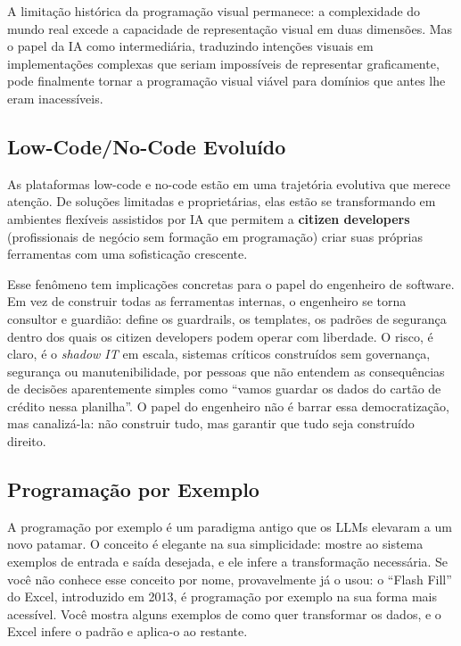 A limitação histórica da programação visual permanece: a complexidade do mundo real excede a capacidade de representação visual em duas dimensões. Mas o papel da IA como intermediária, traduzindo intenções visuais em implementações complexas que seriam impossíveis de representar graficamente, pode finalmente tornar a programação visual viável para domínios que antes lhe eram inacessíveis.

\subsection{Low-Code/No-Code Evoluído}

As plataformas low-code e no-code estão em uma trajetória evolutiva que merece atenção. De soluções limitadas e proprietárias, elas estão se transformando em ambientes flexíveis assistidos por IA que permitem a \textbf{citizen developers} (profissionais de negócio sem formação em programação) criar suas próprias ferramentas com uma sofisticação crescente.

Esse fenômeno tem implicações concretas para o papel do engenheiro de software. Em vez de construir todas as ferramentas internas, o engenheiro se torna consultor e guardião: define os guardrails, os templates, os padrões de segurança dentro dos quais os citizen developers podem operar com liberdade. O risco, é claro, é o \textit{shadow IT} em escala, sistemas críticos construídos sem governança, segurança ou manutenibilidade, por pessoas que não entendem as consequências de decisões aparentemente simples como ``vamos guardar os dados do cartão de crédito nessa planilha''. O papel do engenheiro não é barrar essa democratização, mas canalizá-la: não construir tudo, mas garantir que tudo seja construído direito.

\subsection{Programação por Exemplo}

A programação por exemplo é um paradigma antigo que os LLMs elevaram a um novo patamar. O conceito é elegante na sua simplicidade: mostre ao sistema exemplos de entrada e saída desejada, e ele infere a transformação necessária. Se você não conhece esse conceito por nome, provavelmente já o usou: o ``Flash Fill'' do Excel, introduzido em 2013, é programação por exemplo na sua forma mais acessível. Você mostra alguns exemplos de como quer transformar os dados, e o Excel infere o padrão e aplica-o ao restante.

